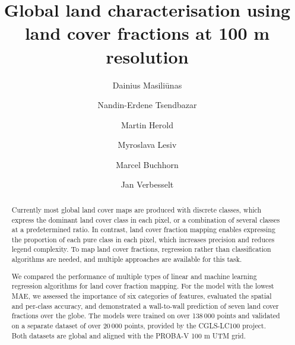 \documentclass[review,authoryear,3p]{elsarticle}
\begin{document}
\begin{frontmatter} %

\title{Global land characterisation using land cover fractions at 100 m resolution}

\author[WURGRS]{Dainius Masiliūnas}

\author[WURGRS]{Nandin-Erdene Tsendbazar}

\author[WURGRS]{Martin Herold}

\author[IIASA]{Myroslava Lesiv}

\author[VITO]{Marcel Buchhorn}

\author[WURGRS]{Jan Verbesselt}

\address[WURGRS]{Wageningen University \& Research, Laboratory of Geo-Information Science and Remote Sensing, Droevendaalsesteeg 3, 6708 PB Wageningen, the Netherlands}
\address[IIASA]{International Institute for Applied Systems Analysis (IIASA), Schlossplatz 1, A-2361 Laxenburg, Austria}
\address[VITO]{Flemish Institute for Technological Research (VITO), Boeretang 200, BE-2400 Mol, Belgium}

\begin{abstract} %
Currently most global land cover maps are produced with discrete classes, which express the dominant land cover class in each pixel, or a combination of several classes at a predetermined ratio. In contrast, land cover fraction mapping enables expressing the proportion of each pure class in each pixel, which increases precision and reduces legend complexity. To map land cover fractions, regression rather than classification algorithms are needed, and multiple approaches are available for this task.

We compared the performance of multiple types of linear and machine learning regression algorithms for land cover fraction mapping.
For the model with the lowest MAE, we assessed the importance of six categories of features, evaluated the spatial and per-class accuracy, and demonstrated a wall-to-wall prediction of seven land cover fractions over the globe.
The models were trained on over 138\,000 points and validated on a separate dataset of over 20\,000 points, provided by the \gls{CGLS-LC100} project. Both datasets are global and aligned with the PROBA-V 100 m UTM grid.


\end{abstract}
\end{frontmatter}
\end{document}
